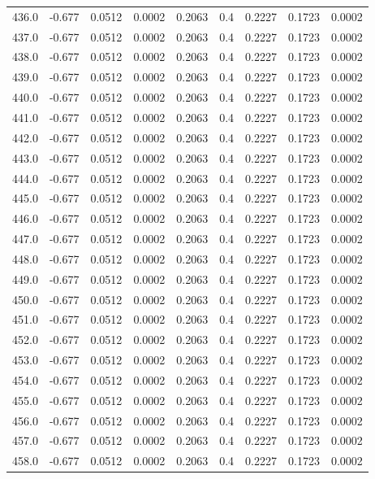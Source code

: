 \begin{longtable}{lrrrrrrrr}
436.0 & -0.677 & 0.0512 & 0.0002 & 0.2063 & 0.4 & 0.2227 & 0.1723 & 0.0002 \\
437.0 & -0.677 & 0.0512 & 0.0002 & 0.2063 & 0.4 & 0.2227 & 0.1723 & 0.0002 \\
438.0 & -0.677 & 0.0512 & 0.0002 & 0.2063 & 0.4 & 0.2227 & 0.1723 & 0.0002 \\
439.0 & -0.677 & 0.0512 & 0.0002 & 0.2063 & 0.4 & 0.2227 & 0.1723 & 0.0002 \\
440.0 & -0.677 & 0.0512 & 0.0002 & 0.2063 & 0.4 & 0.2227 & 0.1723 & 0.0002 \\
441.0 & -0.677 & 0.0512 & 0.0002 & 0.2063 & 0.4 & 0.2227 & 0.1723 & 0.0002 \\
442.0 & -0.677 & 0.0512 & 0.0002 & 0.2063 & 0.4 & 0.2227 & 0.1723 & 0.0002 \\
443.0 & -0.677 & 0.0512 & 0.0002 & 0.2063 & 0.4 & 0.2227 & 0.1723 & 0.0002 \\
444.0 & -0.677 & 0.0512 & 0.0002 & 0.2063 & 0.4 & 0.2227 & 0.1723 & 0.0002 \\
445.0 & -0.677 & 0.0512 & 0.0002 & 0.2063 & 0.4 & 0.2227 & 0.1723 & 0.0002 \\
446.0 & -0.677 & 0.0512 & 0.0002 & 0.2063 & 0.4 & 0.2227 & 0.1723 & 0.0002 \\
447.0 & -0.677 & 0.0512 & 0.0002 & 0.2063 & 0.4 & 0.2227 & 0.1723 & 0.0002 \\
448.0 & -0.677 & 0.0512 & 0.0002 & 0.2063 & 0.4 & 0.2227 & 0.1723 & 0.0002 \\
449.0 & -0.677 & 0.0512 & 0.0002 & 0.2063 & 0.4 & 0.2227 & 0.1723 & 0.0002 \\
450.0 & -0.677 & 0.0512 & 0.0002 & 0.2063 & 0.4 & 0.2227 & 0.1723 & 0.0002 \\
451.0 & -0.677 & 0.0512 & 0.0002 & 0.2063 & 0.4 & 0.2227 & 0.1723 & 0.0002 \\
452.0 & -0.677 & 0.0512 & 0.0002 & 0.2063 & 0.4 & 0.2227 & 0.1723 & 0.0002 \\
453.0 & -0.677 & 0.0512 & 0.0002 & 0.2063 & 0.4 & 0.2227 & 0.1723 & 0.0002 \\
454.0 & -0.677 & 0.0512 & 0.0002 & 0.2063 & 0.4 & 0.2227 & 0.1723 & 0.0002 \\
455.0 & -0.677 & 0.0512 & 0.0002 & 0.2063 & 0.4 & 0.2227 & 0.1723 & 0.0002 \\
456.0 & -0.677 & 0.0512 & 0.0002 & 0.2063 & 0.4 & 0.2227 & 0.1723 & 0.0002 \\
457.0 & -0.677 & 0.0512 & 0.0002 & 0.2063 & 0.4 & 0.2227 & 0.1723 & 0.0002 \\
458.0 & -0.677 & 0.0512 & 0.0002 & 0.2063 & 0.4 & 0.2227 & 0.1723 & 0.0002 \\

\end{longtable}
